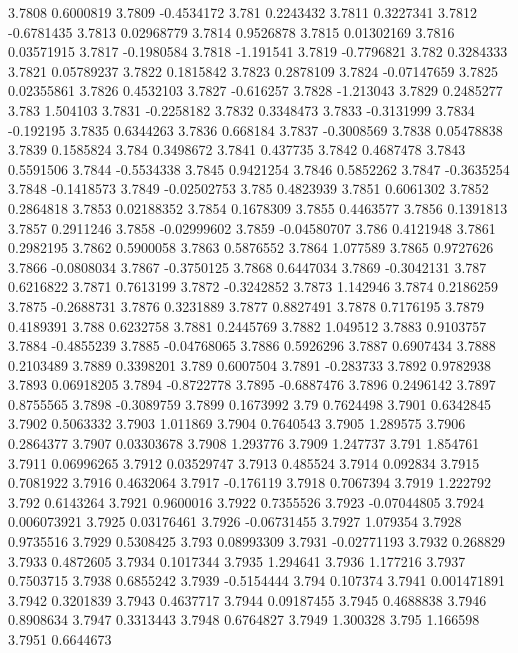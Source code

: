 3.7808  0.6000819
3.7809  -0.4534172
3.781  0.2243432
3.7811  0.3227341
3.7812  -0.6781435
3.7813  0.02968779
3.7814  0.9526878
3.7815  0.01302169
3.7816  0.03571915
3.7817  -0.1980584
3.7818  -1.191541
3.7819  -0.7796821
3.782  0.3284333
3.7821  0.05789237
3.7822  0.1815842
3.7823  0.2878109
3.7824  -0.07147659
3.7825  0.02355861
3.7826  0.4532103
3.7827  -0.616257
3.7828  -1.213043
3.7829  0.2485277
3.783  1.504103
3.7831  -0.2258182
3.7832  0.3348473
3.7833  -0.3131999
3.7834  -0.192195
3.7835  0.6344263
3.7836  0.668184
3.7837  -0.3008569
3.7838  0.05478838
3.7839  0.1585824
3.784  0.3498672
3.7841  0.437735
3.7842  0.4687478
3.7843  0.5591506
3.7844  -0.5534338
3.7845  0.9421254
3.7846  0.5852262
3.7847  -0.3635254
3.7848  -0.1418573
3.7849  -0.02502753
3.785  0.4823939
3.7851  0.6061302
3.7852  0.2864818
3.7853  0.02188352
3.7854  0.1678309
3.7855  0.4463577
3.7856  0.1391813
3.7857  0.2911246
3.7858  -0.02999602
3.7859  -0.04580707
3.786  0.4121948
3.7861  0.2982195
3.7862  0.5900058
3.7863  0.5876552
3.7864  1.077589
3.7865  0.9727626
3.7866  -0.0808034
3.7867  -0.3750125
3.7868  0.6447034
3.7869  -0.3042131
3.787  0.6216822
3.7871  0.7613199
3.7872  -0.3242852
3.7873  1.142946
3.7874  0.2186259
3.7875  -0.2688731
3.7876  0.3231889
3.7877  0.8827491
3.7878  0.7176195
3.7879  0.4189391
3.788  0.6232758
3.7881  0.2445769
3.7882  1.049512
3.7883  0.9103757
3.7884  -0.4855239
3.7885  -0.04768065
3.7886  0.5926296
3.7887  0.6907434
3.7888  0.2103489
3.7889  0.3398201
3.789  0.6007504
3.7891  -0.283733
3.7892  0.9782938
3.7893  0.06918205
3.7894  -0.8722778
3.7895  -0.6887476
3.7896  0.2496142
3.7897  0.8755565
3.7898  -0.3089759
3.7899  0.1673992
3.79  0.7624498
3.7901  0.6342845
3.7902  0.5063332
3.7903  1.011869
3.7904  0.7640543
3.7905  1.289575
3.7906  0.2864377
3.7907  0.03303678
3.7908  1.293776
3.7909  1.247737
3.791  1.854761
3.7911  0.06996265
3.7912  0.03529747
3.7913  0.485524
3.7914  0.092834
3.7915  0.7081922
3.7916  0.4632064
3.7917  -0.176119
3.7918  0.7067394
3.7919  1.222792
3.792  0.6143264
3.7921  0.9600016
3.7922  0.7355526
3.7923  -0.07044805
3.7924  0.006073921
3.7925  0.03176461
3.7926  -0.06731455
3.7927  1.079354
3.7928  0.9735516
3.7929  0.5308425
3.793  0.08993309
3.7931  -0.02771193
3.7932  0.268829
3.7933  0.4872605
3.7934  0.1017344
3.7935  1.294641
3.7936  1.177216
3.7937  0.7503715
3.7938  0.6855242
3.7939  -0.5154444
3.794  0.107374
3.7941  0.001471891
3.7942  0.3201839
3.7943  0.4637717
3.7944  0.09187455
3.7945  0.4688838
3.7946  0.8908634
3.7947  0.3313443
3.7948  0.6764827
3.7949  1.300328
3.795  1.166598
3.7951  0.6644673

